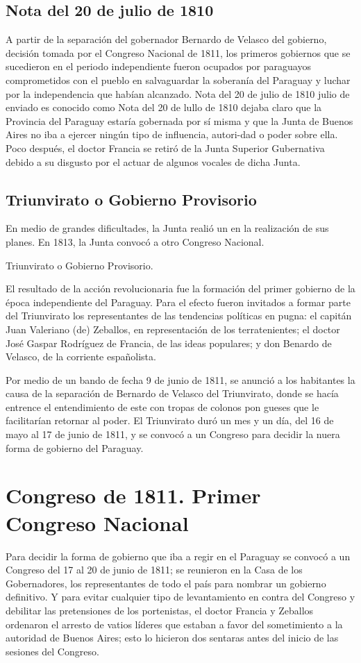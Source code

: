 \documentclass{article}
\begin{document}
  \subsection*{Nota del 20 de julio de 1810}

A partir de la separación del gobernador
Bernardo de Velasco del gobierno,
decisión tomada por el Congreso
Nacional de 1811, los primeros gobiernos
que se sucedieron en el periodo
independiente fueron ocupados por
paraguayos comprometidos con el
pueblo en salvaguardar la soberanía
del Paraguay y luchar por la
independencia que habían alcanzado. 
Nota del 20 de julio de 1810 julio
de enviado es conocido como Nota
del 20 de lullo de 1810 dejaba claro
que la Provincia del Paraguay estaría
gobernada por sí misma y que la Junta
de Buenos Aires no iba a ejercer ningún 
tipo de influencia, autori-dad o poder
sobre ella. Poco después, el doctor
Francia se retiró de la Junta Superior
Gubernativa
debido a su disgusto por el actuar de
algunos vocales de dicha Junta.

  \subsection*{Triunvirato o Gobierno Provisorio}
En medio de grandes dificultades,
la Junta realió un en la realización de sus planes. En 1813, la Junta convocó a otro Congreso Nacional. 

Triunvirato o Gobierno Provisorio.

El resultado de la acción revolucionaria fue la formación
del primer gobierno de la época independiente del Paraguay. Para 
el efecto fueron invitados a formar parte del Triunvirato los 
representantes de las tendencias políticas en pugna: el capitán
Juan Valeriano (de) Zeballos, en representación de los
terratenientes; el doctor José Gaspar Rodríguez de Francia,
de las ideas populares; y don Benardo de Velasco, de la corriente
españolista.

Por medio de un bando de fecha 9 de junio de 1811, se anunció
a los habitantes la causa de la separación de Bernardo de Velasco
del Triunvirato, donde se hacía entrence el entendimiento de este
con tropas de colonos pon gueses que le facilitarían retornar al
poder. El Triunvirato duró un mes y un día, del 16 de mayo al 17 
de junio de 1811, y se convocó a un Congreso para decidir la nuera
forma de gobierno del Paraguay.


\section*{Congreso de 1811. Primer Congreso Nacional}
Para decidir la forma de gobierno que iba a regir en el
Paraguay se convocó a un Congreso del 17 al 20 de junio de 1811;
se reunieron en la Casa de los Gobernadores, los representantes
de todo el país para nombrar un gobierno definitivo. Y para evitar
cualquier tipo de levantamiento en contra del Congreso y debilitar 
las pretensiones de los portenistas, el doctor Francia y Zeballos 
ordenaron el arresto de vatios líderes que estaban a favor del
sometimiento a la autoridad de Buenos Aires; esto lo hicieron dos
sentaras antes del inicio de las sesiones del Congreso.
\end{document}
